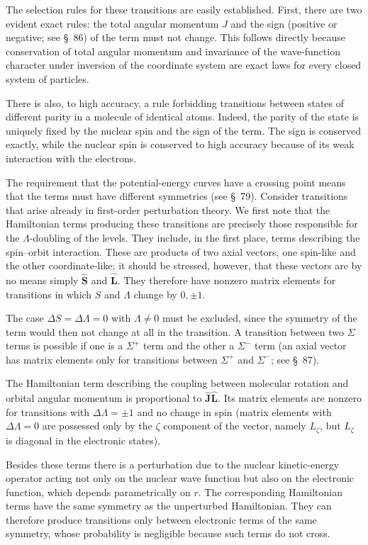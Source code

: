 The selection rules for these transitions are easily established. First, there are two evident exact rules: the total angular momentum $J$ and the sign (positive or negative; see \S~86) of the term must not change. This follows directly because conservation of total angular momentum and invariance of the wave-function character under inversion of the coordinate system are exact laws for every closed system of particles.

There is also, to high accuracy, a rule forbidding transitions between states of different parity in a molecule of identical atoms. Indeed, the parity of the state is uniquely fixed by the nuclear spin and the sign of the term. The sign is conserved exactly, while the nuclear spin is conserved to high accuracy because of its weak interaction with the electrons.

The requirement that the potential-energy curves have a crossing point means that the terms must have different symmetries (see \S~79). Consider transitions that arise already in first-order perturbation theory. We first note that the Hamiltonian terms producing these transitions are precisely those responsible for the $\Lambda$-doubling of the levels. They include, in the first place, terms describing the spin--orbit interaction. These are products of two axial vectors, one spin-like and the other coordinate-like; it should be stressed, however, that these vectors are by no means simply $\widehat{\mathbf S}$ and $\widehat{\mathbf L}$. They therefore have nonzero matrix elements for transitions in which $S$ and $\Lambda$ change by $0,\pm1$.

The case $\Delta S=\Delta\Lambda=0$ with $\Lambda\ne0$ must be excluded, since the symmetry of the term would then not change at all in the transition. A transition between two $\Sigma$ terms is possible if one is a $\Sigma^+$ term and the other a $\Sigma^-$ term (an axial vector has matrix elements only for transitions between $\Sigma^+$ and $\Sigma^-$; see \S~87).

The Hamiltonian term describing the coupling between molecular rotation and orbital angular momentum is proportional to $\widehat{\mathbf J}\widehat{\mathbf L}$. Its matrix elements are nonzero for transitions with $\Delta\Lambda=\pm1$ and no change in spin (matrix elements with $\Delta\Lambda=0$ are possessed only by the $\zeta$ component of the vector, namely $L_\zeta$, but $L_\zeta$ is diagonal in the electronic states).

Besides these terms there is a perturbation due to the nuclear kinetic-energy operator acting not only on the nuclear wave function but also on the electronic function, which depends parametrically on $r$. The corresponding Hamiltonian terms have the same symmetry as the unperturbed Hamiltonian. They can therefore produce transitions only between electronic terms of the same symmetry, whose probability is negligible because such terms do not cross.

